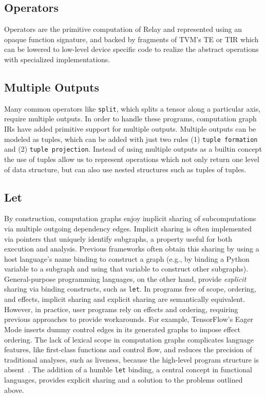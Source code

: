 \subsection{Operators}

Operators are the primitive computation of Relay and represented using
  an opaque function signature, and backed by fragments of TVM's TE or TIR
  which can be lowered to low-level device specific code to realize
  the abstract operations with specialized implementations.

\subsection{Multiple Outputs}

Many common operators like \verb|split|, which splits
  a tensor along a particular axis, require multiple outputs.
In order to handle these programs,
  computation graph IRs have added primitive support
  for multiple outputs.
Multiple outputs can be modeled as tuples, which can
  be added with just two rules (1) \verb|tuple formation|
  and (2) \verb|tuple projection|.
Instead of using multiple outputs as a builtin concept the use
  of tuples allow us to represent operations which not only return
  one level of data structure, but can also use nested structures
  such as tuples of tuples.

\subsection{Let}

By construction, computation graphs enjoy implicit sharing of subcomputations
  via multiple outgoing dependency edges.
Implicit sharing is often implemented via pointers that uniquely identify subgraphs,
  a property useful for both execution and analysis.
Previous frameworks often obtain this sharing by using a host
  language's name binding to construct a graph (e.g., by binding a Python variable
  to a subgraph and using that variable to construct other subgraphs).
General-purpose programming languages, on the other hand, provide \textit{explicit}
  sharing via binding constructs, such as \verb|let|.
In programs free of scope, ordering, and effects, implicit sharing
  and explicit sharing are semantically equivalent.
However, in practice, user programs rely on effects and ordering,
  requiring previous approaches to provide workarounds.
For example, TensorFlow's Eager Mode inserts dummy control edges
  in its generated graphs to impose effect ordering.
The lack of lexical scope in computation graphs complicates language features,
  like first-class functions and control flow,
  and reduces the precision of traditional analyses,
  such as liveness,
  because the high-level program structure is absent~\citep{funarg, funarg_sol}.
The addition of a humble \verb|let| binding, a central concept in functional languages,
  provides explicit sharing and a solution to the problems outlined above.

